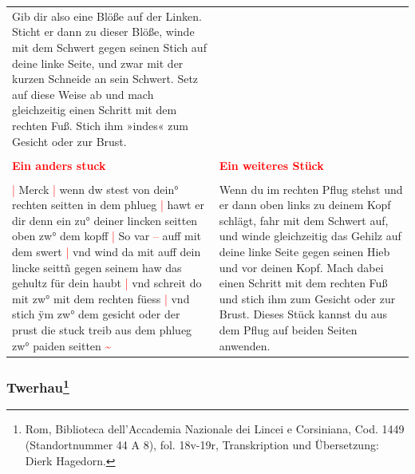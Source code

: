 \begin{longtable}{p{6.25cm}p{6.25cm}}
    Gib dir also eine Blöße auf der Linken.
    Sticht er dann zu dieser Blöße, winde mit dem Schwert gegen seinen Stich auf deine linke Seite, und zwar mit der kurzen Schneide an sein Schwert.
    Setz auf diese Weise ab und mach gleichzeitig einen Schritt mit dem rechten Fuß.
    Stich ihm »indes« zum Gesicht oder zur Brust.
    \\
    \\
    \textbf{\textcolor{red}{Ein anders stuck}}
    &
    \textbf{\textcolor{red}{Ein weiteres Stück}}
    \\
    \\
    \textcolor{red}{|} Merck
    \textcolor{red}{|} wenn dw stest von dein° rechten seitten in dem phlueg
    \textcolor{red}{|} hawt er dir denn ein zu° deiner lincken seitten oben zw° dem kopff
    \textcolor{red}{|} So var \textcolor{red}{–} auff mit dem swert
    \textcolor{red}{|} vnd wind da mit auff dein lincke seittñ gegen seinem haw das gehultz für dein haubt
    \textcolor{red}{|} vnd schreit do mit zw° mit dem rechten füess
    \textcolor{red}{|} vnd stich ÿm zw° dem gesicht oder der prust die stuck treib aus dem phlueg zw° paiden seitten \textcolor{red}{\textasciitilde{}}
    &
    Wenn du im rechten Pflug stehst und er dann oben links zu deinem Kopf schlägt, fahr mit dem Schwert auf, und winde gleichzeitig das Gehilz auf deine linke Seite gegen seinen Hieb und vor deinen Kopf.
    Mach dabei einen Schritt mit dem rechten Fuß und stich ihm zum Gesicht oder zur Brust.
    Dieses Stück kannst du aus dem Pflug auf beiden Seiten anwenden.
\end{longtable}

\newpage

\begin{center}
\end{center}

\newpage

\subsubsection[Twerhau]{
    Twerhau\footnote{
        \hspace*{0.5ex}Rom, Biblioteca dell'Accademia Nazionale dei Lincei e Corsiniana,
        Cod. 1449 (Standortnummer 44 A 8), fol. 18v-19r, Transkription und Übersetzung: Dierk Hagedorn.}}

